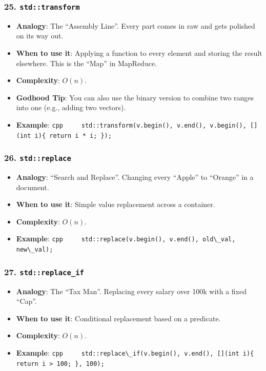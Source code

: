 \hypertarget{stdtransform}{%
\subsubsection{\texorpdfstring{25.
\texttt{std::transform}}{25. std::transform}}\label{stdtransform}}

\begin{itemize}
\tightlist
\item
  \textbf{Analogy}: The ``Assembly Line''. Every part comes in raw and
  gets polished on its way out.
\item
  \textbf{When to use it}: Applying a function to every element and
  storing the result elsewhere. This is the ``Map'' in MapReduce.
\item
  \textbf{Complexity}: \(O(n)\).
\item
  \textbf{Godhood Tip}: You can also use the binary version to combine
  two ranges into one (e.g., adding two vectors).
\item
  \textbf{Example}:
  \passthrough{\lstinline!cpp     std::transform(v.begin(), v.end(), v.begin(), [](int i)\{ return i * i; \});!}
\end{itemize}

\hypertarget{stdreplace}{%
\subsubsection{\texorpdfstring{26.
\texttt{std::replace}}{26. std::replace}}\label{stdreplace}}

\begin{itemize}
\tightlist
\item
  \textbf{Analogy}: ``Search and Replace''. Changing every ``Apple'' to
  ``Orange'' in a document.
\item
  \textbf{When to use it}: Simple value replacement across a container.
\item
  \textbf{Complexity}: \(O(n)\).
\item
  \textbf{Example}:
  \passthrough{\lstinline!cpp     std::replace(v.begin(), v.end(), old\_val, new\_val);!}
\end{itemize}

\hypertarget{stdreplace_if}{%
\subsubsection{\texorpdfstring{27.
\texttt{std::replace\_if}}{27. std::replace\_if}}\label{stdreplace_if}}

\begin{itemize}
\tightlist
\item
  \textbf{Analogy}: The ``Tax Man''. Replacing every salary over 100k
  with a fixed ``Cap''.
\item
  \textbf{When to use it}: Conditional replacement based on a predicate.
\item
  \textbf{Complexity}: \(O(n)\).
\item
  \textbf{Example}:
  \passthrough{\lstinline!cpp     std::replace\_if(v.begin(), v.end(), [](int i)\{ return i > 100; \}, 100);!}
\end{itemize}

